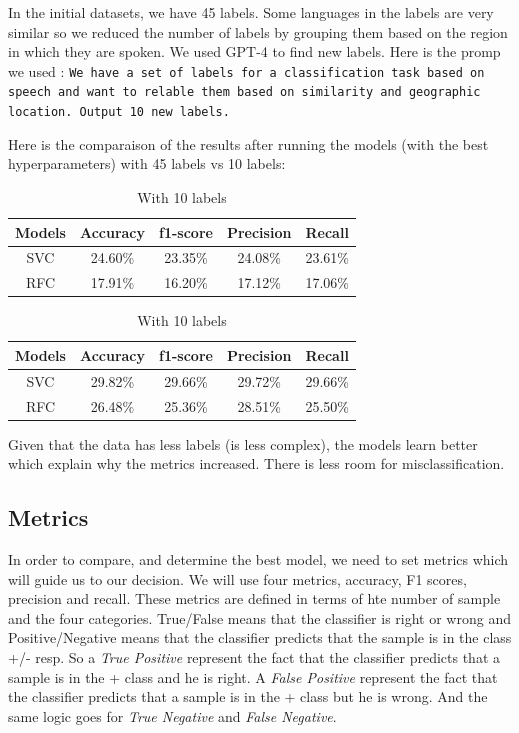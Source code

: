 \documentclass[twocolumn]{article}
\begin{document}
In the initial datasets, we have 45 labels. Some languages in the labels are very similar so we reduced the number of labels by grouping them based on the region in which they are spoken. We used GPT-4 to find new labels. Here is the promp we used : \texttt{We have a set of labels for a classification task based on speech and want to relable them based on similarity and geographic location. Output 10 new labels.}

Here is the comparaison of the results after running the models (with the best hyperparameters) with 45 labels vs 10 labels:
\begin{table}[h]
    \centering
    \begin{tabular}{|c|c|c|c|c|}
    \hline
      Models & Accuracy & f1-score & Precision & Recall\\  
      \hline
      SVC & 24.60\% & 23.35\% & 24.08\% & 23.61\% \\
        \hline
      RFC & 17.91\% & 16.20\% & 17.12\% & 17.06\% \\
    \hline
    \end{tabular}
    \label{tab:my_label}
    \caption{With 45 labels}
    
    \centering
    \begin{tabular}{|c|c|c|c|c|}
    \hline
      Models & Accuracy & f1-score & Precision & Recall\\  
      \hline
      SVC & 29.82\% & 29.66\% & 29.72\% & 29.66\%\\
        \hline
      RFC & 26.48\% & 25.36\% & 28.51\% & 25.50\% \\
    \hline
    \end{tabular}
    \label{tab:my_label}
    \caption{With 10 labels}
\end{table}

Given that the data has less labels (is less complex), the models learn better which explain why the metrics increased. There is less room for misclassification.

\subsection{Metrics}
In order to compare, and determine the best model, we need to set metrics which will guide us to our decision. We will use four metrics, accuracy, F1 scores, precision and recall. These metrics are defined in terms of hte number of sample and the four categories. True/False means that the classifier is right or wrong and Positive/Negative means that the classifier predicts that the sample is in the class +/- resp. So a \textit{True Positive} represent the fact that the classifier predicts that a sample is in the + class and he is right. A \textit{False Positive} represent the fact that the classifier predicts that a sample is in the + class but he is wrong. And the same logic goes for \textit{True Negative}  and \textit{False Negative}.
\end{document}

